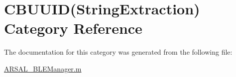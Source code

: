 \hypertarget{categoryCBUUID_07StringExtraction_08}{}\section{C\+B\+U\+U\+ID(String\+Extraction) Category Reference}
\label{categoryCBUUID_07StringExtraction_08}


The documentation for this category was generated from the following file\+:\begin{DoxyCompactItemize}
\item 
\hyperlink{ARSAL__BLEManager_8m}{A\+R\+S\+A\+L\+\_\+\+B\+L\+E\+Manager.\+m}\end{DoxyCompactItemize}
